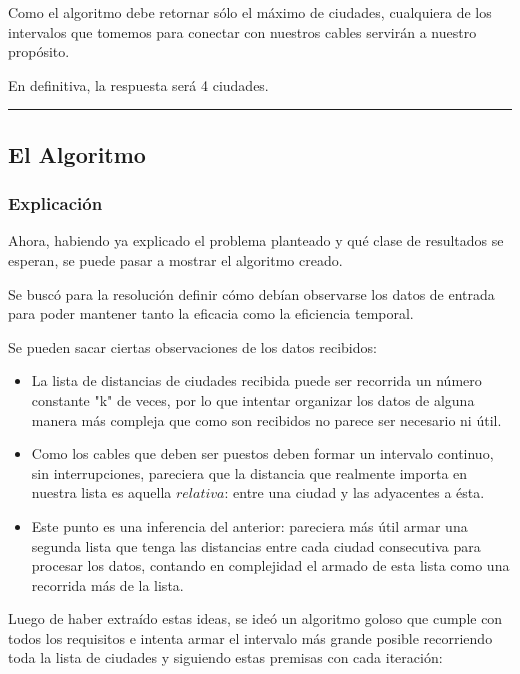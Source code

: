 \documentclass[spanish,a4paper]{article}
\newcommand{\linea}{\noindent\rule{15cm}{0.4pt}}
\begin{document}
Como el algoritmo debe retornar sólo el máximo de ciudades, cualquiera de los intervalos que tomemos para conectar con nuestros cables servirán a nuestro propósito.

En definitiva, la respuesta será 4 ciudades.

\linea

\subsection{El Algoritmo}
\subsubsection{Explicación}
Ahora, habiendo ya explicado el problema planteado y qué clase de resultados se esperan, se puede pasar a mostrar el algoritmo creado.

Se buscó para la resolución definir cómo debían observarse los datos de entrada para poder mantener tanto la eficacia como la eficiencia temporal.

Se pueden sacar ciertas observaciones de los datos recibidos:

\begin{itemize}

\item La lista de distancias de ciudades recibida puede ser recorrida un número constante "k" de veces, por lo que intentar organizar los datos de alguna manera más compleja que como son recibidos no parece ser necesario ni útil.

\item Como los cables que deben ser puestos deben formar un intervalo continuo, sin interrupciones, pareciera que la distancia que realmente importa en nuestra lista es aquella $relativa$: entre una ciudad y las adyacentes a ésta.


\item Este punto es una inferencia del anterior: pareciera más útil armar una segunda lista que tenga las distancias entre cada ciudad consecutiva para procesar los datos, contando en complejidad el armado de esta lista  como una recorrida más de la lista.

\end{itemize}

Luego de haber extraído estas ideas, se ideó un algoritmo goloso que cumple con todos los requisitos e intenta armar el intervalo más grande posible recorriendo toda la lista de ciudades y siguiendo estas premisas con cada iteración:
\end{document}
